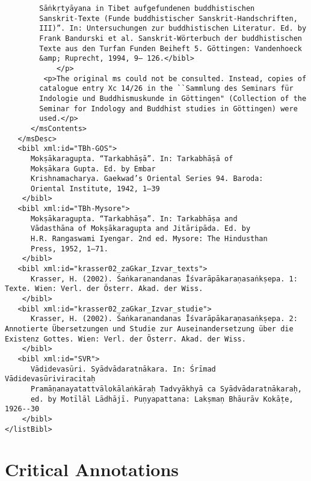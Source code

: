 \documentclass[article,12pt,a4paper]{memoir}%
\begin{document}
\begin{verbatim}
	    Sāṅkṛtyāyana in Tibet aufgefundenen buddhistischen
	    Sanskrit-Texte (Funde buddhistischer Sanskrit-Handschriften,
	    III)”. In: Untersuchungen zur buddhistischen Literatur. Ed. by
	    Frank Bandurski et al. Sanskrit-Wörterbuch der buddhistischen
	    Texte aus den Turfan Funden Beiheft 5. Göttingen: Vandenhoeck
	    &amp; Ruprecht, 1994, 9– 126.</bibl>
	        </p>
         <p>The original ms could not be consulted. Instead, copies of
	    catalogue entry Xc 14/26 in the ``Sammlung des Seminars für
	    Indologie und Buddhismuskunde in Göttingen" (Collection of the
	    Seminar for Indology and Buddhist studies in Göttingen) were
	    used.</p>
      </msContents>
   </msDesc>
   <bibl xml:id="TBh-GOS">
	  Mokṣākaragupta. “Tarkabhāṣā”. In: Tarkabhāṣā of
	  Mokṣākara Gupta. Ed. by Embar
	  Krishnamacharya. Gaekwad’s Oriental Series 94. Baroda:
	  Oriental Institute, 1942, 1–39
	</bibl>
   <bibl xml:id="TBh-Mysore">
	  Mokṣākaragupta. “Tarkabhāṣa”. In: Tarkabhāṣa and
	  Vādasthāna of Mokṣākaragupta and Jitāripāda. Ed. by
	  H.R. Rangaswami Iyengar. 2nd ed. Mysore: The Hindusthan
	  Press, 1952, 1–71.
	</bibl>
   <bibl xml:id="krasser02_zaGkar_Izvar_texts">
	  Krasser, H. (2002). Śaṅkaranandanas Īśvarāpākaraṇasaṅkṣepa. 1: Texte. Wien: Verl. der Österr. Akad. der Wiss.
	</bibl>
   <bibl xml:id="krasser02_zaGkar_Izvar_studie">
	  Krasser, H. (2002). Śaṅkaranandanas Īśvarāpākaraṇasaṅkṣepa. 2: Annotierte Übersetzungen und Studie zur Auseinandersetzung über die Existenz Gottes. Wien: Verl. der Österr. Akad. der Wiss.
	</bibl>
   <bibl xml:id="SVR">
	  Vādidevasūri. Syādvādaratnākara. In: Śrīmad Vādidevasūriviracitaḥ
	  Pramāṇanayatattvālokālaṅkāraḥ Tadvyākhyā ca Syādvādaratnākaraḥ,
	  ed. by Motīlāl Lādhājī. Puṇyapattana: Lakṣmaṇ Bhāurāv Kokāṭe, 1926--30
	</bibl>
</listBibl>
       \end{verbatim}
     
\chapter*[{Critical Annotations}]{Critical Annotations}                                                                                                              %
     
\end{document}
